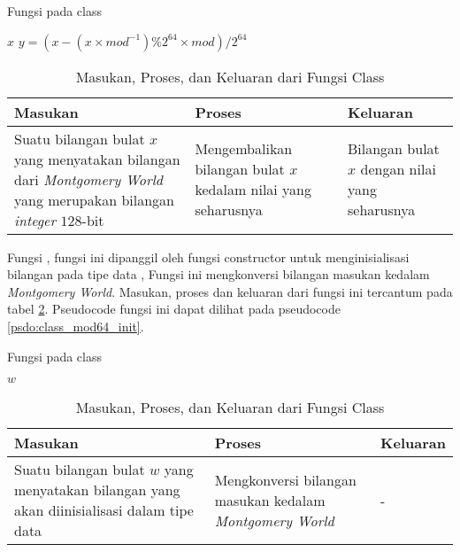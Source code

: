 \begin{algorithm}
	\caption{Fungsi  pada class }
	\label{psdo:class_mod64_reduce}
	\begin{algorithmic}[1]
		\Require $ x $
		\State \Return $ y = ( x - ( x \times mod^{-1}) \% 2^{64} \times mod ) / 2^{64} $ 
	\end{algorithmic}
\end{algorithm}

\begin{table}[]
	\Centering
	\begin{tabular}{|p{3cm}|p{3cm}|p{3cm}|}
	\hline
	Masukan                                                      & Proses                                   & Keluaran \\ \hline
	Suatu bilangan bulat $x$ yang menyatakan bilangan dari \textit{Montgomery World} yang merupakan bilangan \textit{integer} $128$-bit & Mengembalikan bilangan bulat $x$ kedalam nilai yang seharusnya & Bilangan bulat $x$ dengan nilai yang seharusnya    \\ \hline
	\end{tabular}
	\caption{Masukan, Proses, dan Keluaran dari Fungsi  Class }
	\label{tab:class_mod64_reduce}
\end{table}

\newpage

Fungsi , fungsi ini dipanggil oleh fungsi constructor untuk menginisialisasi bilangan pada tipe data , Fungsi ini mengkonversi bilangan masukan kedalam \textit{Montgomery World}. Masukan, proses dan keluaran dari fungsi ini tercantum pada tabel \ref{tab:class_mod64_init}. Pseudocode fungsi ini dapat dilihat pada pseudocode \ref{psdo:class_mod64_init}.

\begin{algorithm}
	\caption{Fungsi  pada class }
	\label{psdo:class_mod64_init}
	\begin{algorithmic}[1]		
		\Require $ w $
		\State \Return {}
	\end{algorithmic}
\end{algorithm}

\begin{table}[]
	\Centering
	\begin{tabular}{|p{3cm}|p{3cm}|p{3cm}|}
	\hline
	Masukan                                                      & Proses                                   & Keluaran \\ \hline
	Suatu bilangan bulat $w$ yang menyatakan bilangan yang akan diinisialisasi dalam tipe data \fakesc{Mod64} & Mengkonversi bilangan masukan kedalam \textit{Montgomery World} & -    \\ \hline
	\end{tabular}
	\caption{Masukan, Proses, dan Keluaran dari Fungsi  Class }
	\label{tab:class_mod64_init}
\end{table}

